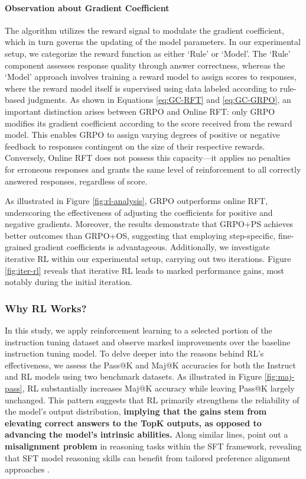 \begin{itemize}[topsep=0pt]
\begin{itemize}[topsep=0pt]
\paragraph{Observation about Gradient Coefficient} The algorithm utilizes the reward signal to modulate the gradient coefficient, which in turn governs the updating of the model parameters. In our experimental setup, we categorize the reward function as either `Rule' or `Model'. The `Rule' component assesses response quality through answer correctness, whereas the `Model' approach involves training a reward model to assign scores to responses, where the reward model itself is supervised using data labeled according to rule-based judgments. As shown in Equations \ref{eq:GC-RFT} and \ref{eq:GC-GRPO}, an important distinction arises between GRPO and Online RFT: only GRPO modifies its gradient coefficient according to the score received from the reward model. This enables GRPO to assign varying degrees of positive or negative feedback to responses contingent on the size of their respective rewards. Conversely, Online RFT does not possess this capacity—it applies no penalties for erroneous responses and grants the same level of reinforcement to all correctly answered responses, regardless of score.

As illustrated in Figure \ref{fig:rl-analysis}, GRPO outperforms online RFT, underscoring the effectiveness of adjusting the coefficients for positive and negative gradients. Moreover, the results demonstrate that GRPO+PS achieves better outcomes than GRPO+OS, suggesting that employing step-specific, fine-grained gradient coefficients is advantageous. Additionally, we investigate iterative RL within our experimental setup, carrying out two iterations. Figure \ref{fig:iter-rl} reveals that iterative RL leads to marked performance gains, most notably during the initial iteration.

\subsubsection{Why RL Works?} In this study, we apply reinforcement learning to a selected portion of the instruction tuning dataset and observe marked improvements over the baseline instruction tuning model. To delve deeper into the reasons behind RL’s effectiveness, we assess the Pass@K and Maj@K accuracies for both the Instruct and RL models using two benchmark datasets. As illustrated in Figure \ref{fig:maj-pass}, RL substantially increases Maj@K accuracy while leaving Pass@K largely unchanged. This pattern suggests that RL primarily strengthens the reliability of the model’s output distribution, \textbf{implying that the gains stem from elevating correct answers to the TopK outputs, as opposed to advancing the model’s intrinsic abilities.} Along similar lines, \citep{wang2023making} point out a \textbf{misalignment problem} in reasoning tasks within the SFT framework, revealing that SFT model reasoning skills can benefit from tailored preference alignment approaches \citep{yuan2023rrhf,song2023preference,wang2023making}.


\end{itemize}
\end{itemize}
